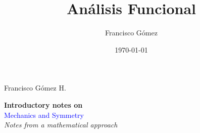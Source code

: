 \documentclass[a4paper, 11pt]{book}
\title{An\'alisis Funcional}
\author{Francisco G\'omez}
\date{\today}
\theoremstyle{definition}
\begin{document}
\begin{titlepage} %

	\raggedleft %
	
	\vspace*{\baselineskip} %
	
	
	{\Large Francisco Gómez H.} %
	
	\vspace*{0.167\textheight} %
	
	
	\textbf{\LARGE Introductory notes on}\\[\baselineskip] %
	
	{\textcolor{Blue}{\Huge Mechanics and Symmetry}}\\[\baselineskip] %
	
	{\Large \textit{Notes from a mathematical approach}} %
	
	\vfill %
	
	
	
	\vspace*{3\baselineskip} %

\end{titlepage}

\newpage

\tableofcontents








\printindex
\end{document}
